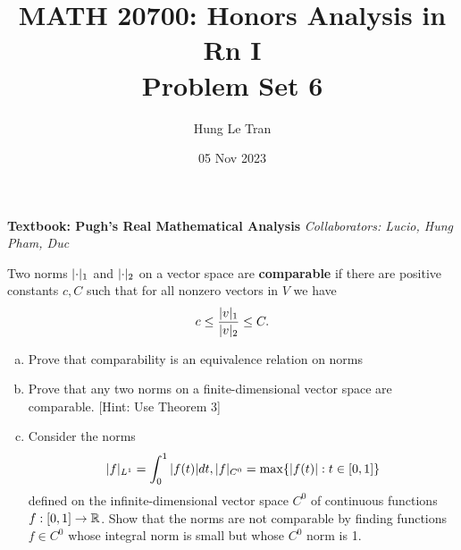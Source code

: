 \documentclass[a4paper, 12pt]{article}
\title{MATH 20700: Honors Analysis in Rn I \\ \large Problem Set 6}
\date{05 Nov 2023}
\author{Hung Le Tran}
\begin{document}
\maketitle
\setcounter{section}{6}
\textbf{Textbook: Pugh's Real Mathematical Analysis}
\textit{Collaborators: Lucio, Hung Pham, Duc}

\begin{problem} 
Two norms $\lvert\cdot\rvert_1$ and $\lvert\cdot\rvert_2$ on a vector space are \textbf{comparable} if there are positive constants $c, C$ such that for all nonzero vectors in $V$ we have \[
    c \leq \frac{\lvert v\rvert_1}{\lvert v\rvert_2} \leq C.
\]
\begin{enumerate} [(a)]
    \item Prove that comparability is an equivalence relation on norms
    \item Prove that any two norms on a finite-dimensional vector space are comparable. [Hint: Use Theorem 3]
    \item Consider the norms \[
              \lvert f\rvert_{L^1} = \int_{0}^{1} |f(t)| dt, \lvert f\rvert_{C^0} = \max\{|f(t)| : t \in [0, 1]\}
          \]
          defined on the infinite-dimensional vector space $C^0$ of continuous functions $f: [0, 1] \to \mathbb{R}$. Show that the norms are not comparable by finding functions $f \in C^0$ whose integral norm is small but whose $C^0$ norm is 1.
\end{enumerate}
\end{problem}
\end{document}
